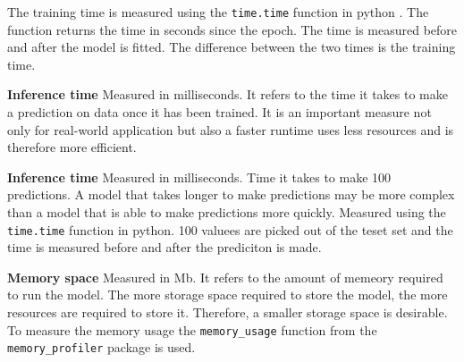 The training time is measured using the \texttt{time.time} function in python
. The function
returns the time in seconds since the epoch. The time is measured before and
after the model is
fitted. The difference between the two times is the training time.

\textbf{Inference time}
Measured in milliseconds. It refers to the time it takes to make a prediction
on data once it has
been trained.
It is an important measure not only for real-world application but also a
faster runtime uses
less resources and is therefore more efficient.

\textbf{Inference time}
Measured in milliseconds. Time it takes to make 100 predictions.
A model that takes longer to make predictions may be more complex than a
model that is able to
make predictions more quickly.
Measured using the \texttt{time.time} function in python. 100 valuees are
picked out of the teset
set and the time is measured before and after the prediciton is made.

\textbf{Memory space}
Measured in Mb.
It refers to the amount of memeory required to run the model.
The more storage space required to store the model, the more resources are
required to store it.
Therefore, a smaller storage space is desirable.
To measure the memory usage the \texttt{memory\_usage} function from the
\texttt{memory\_profiler}
package is used.


